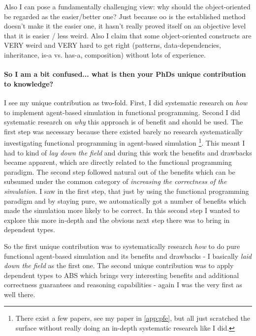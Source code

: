 Also I can pose a fundamentally challenging view: why should the object-oriented be regarded as the easier/better one? Just because oo is the established method doesn't make it the easier one, it hasn't really proved itself on an objective level that it is easier / less weird. Also I claim that some object-oriented constructs are VERY weird and VERY hard to get right (patterns, data-dependencies, inheritance, is-a vs. has-a, composition) without lots of experience.

\paragraph{So I am a bit confused... what is then your PhDs unique contribution to knowledge?}
I see my unique contribution as two-fold. First, I did systematic research on \textit{how} to implement agent-based simulation in functional programming. Second I did systematic research on \textit{why} this approach is of benefit and should be used. The first step was necessary because there existed barely no research systematically investigating functional programming in agent-based simulation \footnote{There exist a few papers, see my paper in \ref{app:pfe}, but all just scratched the surface without really doing an in-depth systematic research like I did.}. This meant I had to kind of \textit{lay down the field} and during this work the benefits and drawbacks became apparent, which are directly related to the functional programming paradigm. 
The second step followed natural out of the benefits which can be subsumed under the common category of \textit{increasing the correctness of the simulation}. I saw in the first step, that just by using the functional programming paradigm and by staying pure, we automatically got a number of benefits which made the simulation more likely to be correct. In this second step I wanted to explore this more in-depth and the obvious next step there was to bring in dependent types. 

So the first unique contribution was to systematically research \textit{how} to do pure functional agent-based simulation and its benefits and drawbacks - I basically \textit{laid down the field} as the first one.
The second unique contribution was to apply dependent types to ABS which brings very interesting benefits and additional correctness guarantees and reasoning capabilities - again I was the very first as well there.

